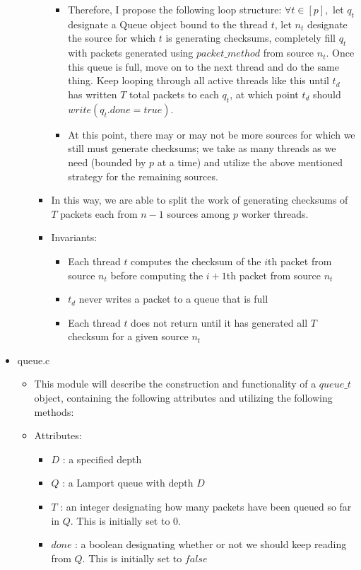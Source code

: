 \documentclass[]{article}
\begin{document}
\begin{itemize}
\begin{itemize}
\begin{itemize}
\begin{itemize}
				\item Therefore, I propose the following loop structure: $\forall t \in [p],$ let $q_t$ designate a Queue object bound to the thread $t$, let $n_t$ designate the source for which $t$ is generating checksums, completely fill $q_t$ with packets generated using $packet\_method$ from source $n_t$. Once this queue is full, move on to the next thread and do the same thing. Keep looping through all active threads like this until $t_d$ has written $T$ total packets to each $q_t$, at which point $t_d$ should $write(q_t.done = true)$.
				\item At this point, there may or may not be more sources for which we still must generate checksums; we take as many threads as we need (bounded by $p$ at a time) and utilize the above mentioned strategy for the remaining sources.
			\end{itemize}
			\item In this way, we are able to split the work of generating checksums of $T$ packets each from $n - 1$ sources among $p$ worker threads.
			\item Invariants:
			\begin{itemize}
				\item Each thread $t$ computes the checksum of the $i$th packet from source $n_t$ before computing the $i + 1$th packet from source $n_t$
				\item $t_d$ never writes a packet to a queue that is full
				\item Each thread $t$ does not return until it has generated all $T$ checksum for a given source $n_t$
			\end{itemize}
		\end{itemize}
	\end{itemize}
	\item queue.c
	\begin{itemize}
		\item This module will describe the construction and functionality of a $queue\_t$ object, containing the following attributes and utilizing the following methods:
		\item Attributes:
		\begin{itemize}
			\item $D$ : a specified depth
			\item $Q$ : a Lamport queue with depth $D$
			\item $T$ : an integer designating how many packets have been queued so far in $Q$. This is initially set to 0.
			\item $done$ : a boolean designating whether or not we should keep reading from $Q$. This is initially set to $false$

\end{itemize}
\end{itemize}
\end{itemize}
\end{document}
